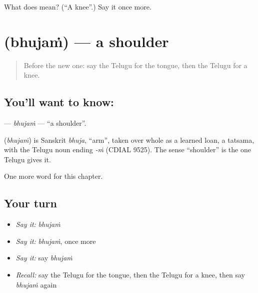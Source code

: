 \begin{tcolorbox}[breakable,colback=teal!4,colframe=teal!35!black,title={Before you move on}]
What does  mean? (\textquotedblleft{}A knee\textquotedblright{}.) Say it once more.
\end{tcolorbox}
\section[\texorpdfstring{\te{భుజం} (bhujaṁ)}{భుజం (bhujaṁ)}]{ (bhujaṁ) — a shoulder}

\label{lesson:TE-C127-bhujam}



\begin{quote}
Before the new one: say the Telugu for the tongue, then the Telugu for a knee.
\end{quote}

\subsection*{You'll want to know: }
\textbf{} — \emph{bhujaṁ} — \textquotedblleft{}a shoulder\textquotedblright{}.

\begin{cousinweb}
\textbf{} (\emph{bhujaṁ}) is Sanskrit \emph{bhuja}, \textquotedblleft{}arm\textquotedblright{}, taken over whole as a learned loan, a tatsama, with the Telugu noun ending \emph{-ṁ} (CDIAL 9525). The sense \textquotedblleft{}shoulder\textquotedblright{} is the one Telugu gives it.
\end{cousinweb}

\begin{grammarlens}[title={What you've built}]
One more word for this chapter.
\end{grammarlens}

\subsection*{Your turn}
\begin{itemize}
\raggedright
  \item \emph{Say it:} \emph{bhujaṁ}
  \item \emph{Say it:} \emph{bhujaṁ}, once more
  \item \emph{Say it:} say \emph{bhujaṁ}
  \item \emph{Recall:} say the Telugu for the tongue, then the Telugu for a knee, then say \emph{bhujaṁ} again
\end{itemize}

